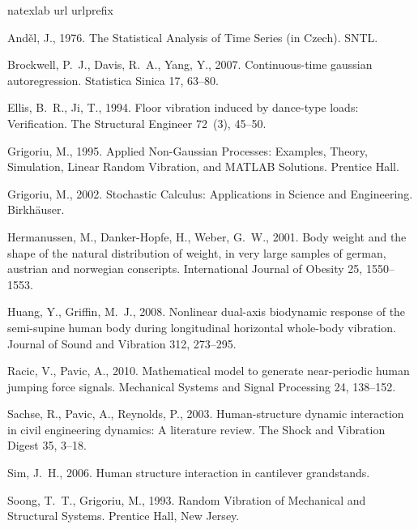 \documentclass[preprint,12pt,authoryear]{elsarticle}
\begin{document}
\begin{thebibliography}{11}
	\expandafter\ifx\csname natexlab\endcsname\relax\def\natexlab#1{#1}\fi
	\expandafter\ifx\csname url\endcsname\relax
	\def\url#1{\texttt{#1}}\fi
	\expandafter\ifx\csname urlprefix\endcsname\relax\def\urlprefix{URL }\fi
	
	And\v{e}l, J., 1976. The Statistical Analysis of Time Series (in Czech). SNTL.
	
	Brockwell, P.~J., Davis, R.~A., Yang, Y., 2007. Continuous-time gaussian
	autoregression. Statistica Sinica 17, 63--80.
	
	Ellis, B.~R., Ji, T., 1994. Floor vibration induced by dance-type loads:
	Verification. The Structural Engineer 72~(3), 45--50.
	
	Grigoriu, M., 1995. Applied Non-Gaussian Processes: Examples, Theory,
	Simulation, Linear Random Vibration, and MATLAB Solutions. Prentice Hall.
	
	Grigoriu, M., 2002. Stochastic Calculus: Applications in Science and
	Engineering. Birkh\"{a}user.
	
	Hermanussen, M., Danker-Hopfe, H., Weber, G.~W., 2001. Body weight and the
	shape of the natural distribution of weight, in very large samples of german,
	austrian and norwegian conscripts. International Journal of Obesity 25,
	1550--1553.
	
	Huang, Y., Griffin, M.~J., 2008. Nonlinear dual-axis biodynamic response of the
	semi-supine human body during longitudinal horizontal whole-body vibration.
	Journal of Sound and Vibration 312, 273--295.
	
	Racic, V., Pavic, A., 2010. Mathematical model to generate near-periodic human
	jumping force signals. Mechanical Systems and Signal Processing 24, 138--152.
	
	Sachse, R., Pavic, A., Reynolds, P., 2003. Human-structure dynamic interaction
	in civil engineering dynamics: A literature review. The Shock and Vibration
	Digest 35, 3--18.
	
	Sim, J.~H., 2006. Human structure interaction in cantilever grandstands.
	
	Soong, T.~T., Grigoriu, M., 1993. Random Vibration of Mechanical and Structural
	Systems. Prentice Hall, New Jersey.
	
\end{thebibliography}
\end{document}

